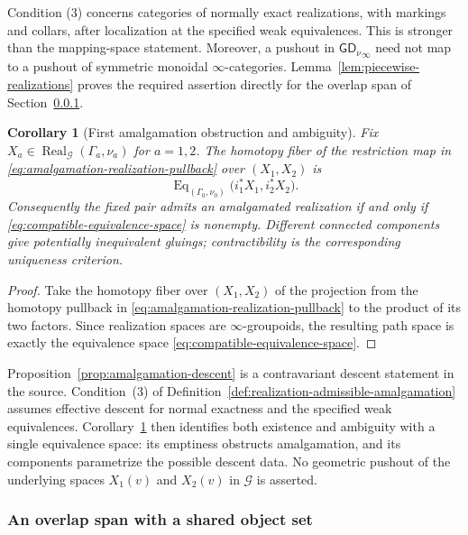 \documentclass[11pt,letterpaper,twoside]{article}
\theoremstyle{plain}
\newtheorem{corollary}[theorem]{Corollary}
\theoremstyle{definition}
\theoremstyle{remark}
\newcommand{\LGrm}{\mathsf{GD}_{\nu}}
\newcommand{\Real}{\operatorname{Real}}
\begin{document}
Condition (3) concerns categories of normally exact realizations, with markings and collars, after localization at the specified weak equivalences.  This is stronger than the mapping-space statement.  Moreover, a pushout in \({\LGrm}_\infty\) need not map to a pushout of symmetric monoidal \(\infty\)-categories.  Lemma~\ref{lem:piecewise-realizations} proves the required assertion directly for the overlap span of Section~\ref{sec:overlap-span}.

\begin{corollary}[First amalgamation obstruction and ambiguity]\label{cor:amalgamation-obstruction}
Fix $X_a\in\Real_{\mathcal G}(\Gamma_a,\nu_a)$ for $a=1,2$.  The homotopy fiber of the restriction map in \eqref{eq:amalgamation-realization-pullback} over $(X_1,X_2)$ is
\begin{equation}\label{eq:compatible-equivalence-space}
 \operatorname{Eq}_{(\Gamma_0,\nu_0)}
 \bigl(i_1^*X_1,i_2^*X_2\bigr).
\end{equation}
Consequently the fixed pair admits an amalgamated realization if and only if \eqref{eq:compatible-equivalence-space} is nonempty.  Different connected components give potentially inequivalent gluings; contractibility is the corresponding uniqueness criterion.
\end{corollary}

\begin{proof}
Take the homotopy fiber over $(X_1,X_2)$ of the projection from the homotopy pullback in \eqref{eq:amalgamation-realization-pullback} to the product of its two factors.  Since realization spaces are \(\infty\)-groupoids, the resulting path space is exactly the equivalence space \eqref{eq:compatible-equivalence-space}.
\end{proof}

Proposition~\ref{prop:amalgamation-descent} is a contravariant descent statement in the source.  Condition~(3) of Definition~\ref{def:realization-admissible-amalgamation} assumes effective descent for normal exactness and the specified weak equivalences.  Corollary~\ref{cor:amalgamation-obstruction} then identifies both existence and ambiguity with a single equivalence space: its emptiness obstructs amalgamation, and its components parametrize the possible descent data.  No geometric pushout of the underlying spaces $X_1(v)$ and $X_2(v)$ in $\mathcal G$ is asserted.

\subsubsection{An overlap span with a shared object set}\label{sec:overlap-span}
\end{document}
